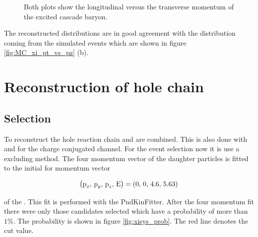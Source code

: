 	\begin{figure}
		\centering
		\caption{\propose Both plots show the longitudinal versus the transverse momentum of the excited cascade baryon.}
		\label{fig:xi1820_pt_vs_pz}
	\end{figure}
	
	The reconstructed distributions are in good agreement with the distribution coming from the simulated events which are 
	shown in figure \ref{fig:MC_xi_pt_vs_pz} (b).
	
\section{Reconstruction of hole chain}

	\subsection*{Selection}
	
	To reconstruct the hole reaction chain \excitedcascade and \anticascade are combined.
	This is also done with \excitedanticascade and \cascade for the charge conjugated channel.
	For the event selection now it is use a excluding method. 
	The four momentum vector of the daughter particles is fitted to the initial for momentum vector  

	\begin{center}
		\begin{equation}\nonumber
			\left(\textnormal{p}_x,\, \textnormal{p}_y,\, \textnormal{p}_z,\, \textnormal{E} \right) = \left(0,\, 0,\, 4.6,\, 5.63 \right)
		\end{equation}
	\end{center}
	of the \pbarpSystem.	
	This fit is performed with the PndKinFitter.
	After the four momentum fit there were only those candidates selected which have a \chisq probability of more than $1\%$.
	The \chisq probability is shown in figure \ref{fig:xisys_prob}. 
	The red line denotes the cut value.

